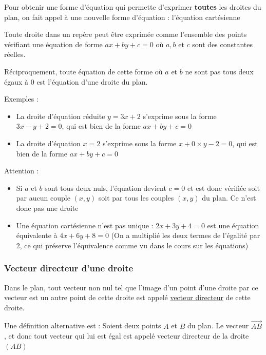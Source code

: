 \documentclass[10pt,a4paper,oneside]{book}
\begin{document}
Pour obtenir une forme d'équation qui permette d'exprimer \textbf{toutes} les droites du plan, on fait appel à une nouvelle forme d'équation : l'équation cartésienne

\begin{de}
  Toute droite dans un repère peut être exprimée comme l'ensemble des points vérifiant une équation de forme $ax+by+c=0$ où $a,b$ et $c$ sont des constantes réelles. 

  Réciproquement, toute équation de cette forme où $a$ et $b$ ne sont pas tous deux égaux à $0$ est l'équation d'une droite du plan.
\end{de}

Exemples :\begin{itemize}
  \item La droite d'équation réduite $y=3x+2$ s'exprime sous la forme $3x-y+2=0$, qui est bien de la forme $ax+by+c=0$
  \item La droite d'équation $x=2$ s'exprime sous la forme $x+0 \times y-2=0$, qui est bien de la forme $ax+by+c=0$
\end{itemize}

Attention : \begin{itemize}
  \item Si $a$ et $b$ sont tous deux nuls, l'équation devient $c=0$ et est donc vérifiée soit par aucun couple $(x,y)$ soit par tous les couples $(x,y)$ du plan. Ce n'est donc pas une droite
  \item Une équation cartésienne n'est pas unique : $2x+3y+4=0$ est une équation équivalente à $4x+6y+8=0$ (On a multiplié les deux termes de l'égalité par 2, ce qui préserve l'équivalence comme vu dans le cours sur les équations)
\end{itemize}

\subsubsection{Vecteur directeur d'une droite}

\begin{de}
Dans le plan, tout vecteur non nul tel que l'image d'un point d'une droite par ce vecteur est un autre point de cette droite est appelé \underline{vecteur directeur} de cette droite.
\end{de}

Une définition alternative est : Soient deux points $A$ et $B$ du plan. Le vecteur $\overrightarrow{AB}$, et donc tout vecteur qui lui est égal est appelé vecteur directeur de la droite $(AB)$
\end{document}
